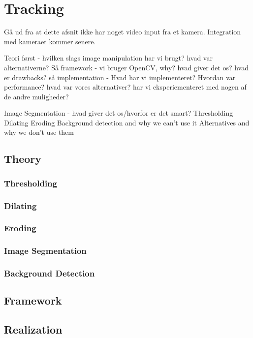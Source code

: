
\section{Tracking}

Gå ud fra at dette afsnit ikke har noget video input fra et kamera. Integration med kameraet kommer senere.

Teori først - hvilken slags image manipulation har vi brugt? hvad var alternativerne?
Så framework - vi bruger OpenCV, why? hvad giver det os? hvad er drawbacks?
så implementation - Hvad har vi implementeret? Hvordan var performance? hvad var vores alternativer? har vi eksperiementeret med nogen af de andre muligheder?

Image Segmentation - hvad giver det os/hvorfor er det smart?
Thresholding
Dilating
Eroding
Background detection and why we can't use it
Alternatives and why we don't use them

\subsection{Theory}

\subsubsection{Thresholding}

\subsubsection{Dilating}

\subsubsection{Eroding}

\subsubsection{Image Segmentation}

\subsubsection{Background Detection}

\subsection{Framework}

\subsection{Realization}


